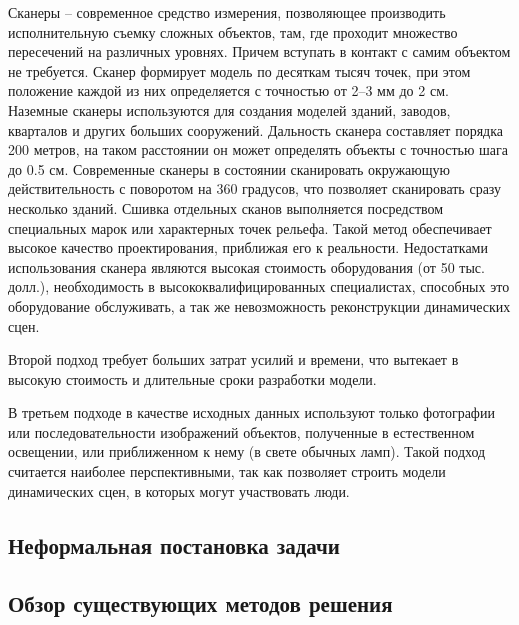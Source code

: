 Сканеры -- современное средство измерения, позволяющее производить исполнительную съемку сложных объектов, там, где проходит множество пересечений на различных уровнях. Причем вступать в контакт с самим объектом не требуется. Сканер формирует модель по десяткам тысяч точек, при этом положение каждой из них определяется с точностью от 2--3 мм до 2 см. Наземные сканеры используются для создания моделей зданий, заводов, кварталов и других больших сооружений. Дальность сканера составляет порядка 200 метров, на таком расстоянии он может определять объекты с точностью шага до 0.5 см. Современные сканеры в состоянии сканировать окружающую действительность с поворотом на 360 градусов, что позволяет сканировать сразу несколько зданий. Сшивка отдельных сканов выполняется посредством специальных марок или характерных точек рельефа. Такой метод обеспечивает высокое качество проектирования, приближая его к реальности. Недостатками использования сканера являются высокая стоимость оборудования (от 50 тыс. долл.\cite{laser_scanner}), необходимость в высококвалифицированных специалистах, способных это оборудование обслуживать, а так же невозможность реконструкции динамических сцен.\cite{komarova_voxel_coloring}

Второй подход требует больших затрат усилий и времени, что вытекает в высокую стоимость и длительные сроки разработки модели.

В третьем подходе в качестве исходных данных используют только фотографии или последовательности изображений объектов, полученные в естественном освещении, или приближенном к нему (в свете обычных ламп). Такой подход считается наиболее перспективными, так как позволяет строить модели динамических сцен, в которых могут участвовать люди.

\subsection{Неформальная постановка задачи}

\subsection{Обзор существующих методов решения}


